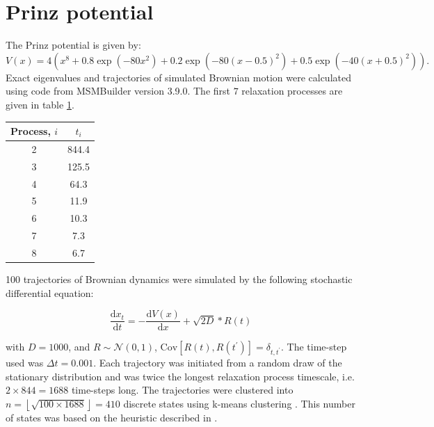 \section{Prinz potential}\label{sec:app_hmm_prinz}
 The Prinz potential is given by: 
\begin{equation}\label{eqn:prinz_pot}
 V(x) = 4\left(x^8 + 0.8 \exp{\left(-80 x^2\right)} + 0.2 \exp{\left(-80 (x-0.5)^2\right)} + 0.5\exp{\left(-40 (x+0.5)^2\right)}\right).
\end{equation}
Exact eigenvalues and trajectories of simulated Brownian motion were calculated using code from MSMBuilder \cite{beauchampMSMBuilder2ModelingConformational2011} version 3.9.0. The first $7$ relaxation processes are given in table \ref{tab:prinz_its_exact}. 
\begin{table}
 \centering
 \begin{tabular}{|c|c|}
 \hline
 Process, $i$ & $t_i$ \\
 \hline\hline
  2 & 844.4 \\
  3 & 125.5 \\
  4 & 64.3 \\
  5 & 11.9 \\
  6 & 10.3 \\
  7 & 7.3 \\
  8 & 6.7 \\
  \hline
 \end{tabular}
 \label{tab:prinz_its_exact}
\end{table}

100 trajectories of Brownian dynamics were simulated by the following stochastic differential equation: 

\begin{equation}\label{eqn:prinz_dynamics}
 \frac{\mathrm{d}x_t}{\mathrm{d}t} = -\frac{\mathrm{d}V(x)}{\mathrm{d}x} + \sqrt{2D} * R(t)
\end{equation}

with $D = 1000$, and $R\sim \mathcal{N}(0, 1)$, $\mathrm{Cov}\left[R(t), R(t^{\prime})\right]=\delta_{t, t^{\prime}}$. The time-step used was $\Delta t = 0.001$. Each trajectory was initiated from a random draw of the stationary distribution and was twice the longest relaxation process timescale, i.e. $2\times 844=1688$ time-steps long. The trajectories were clustered into $n = \left\lfloor\sqrt{100\times 1688}\right\rfloor =410$ discrete states using k-means clustering \cite{friedman2001elements}. This number of states was based on the heuristic described in \cite{husicWardClusteringImproves2017a}.


